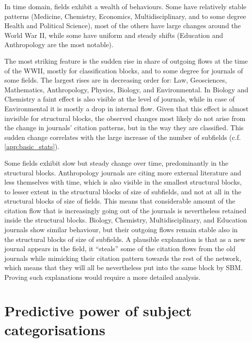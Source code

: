 \documentclass[a4paper,12pt]{article}
\begin{document}
In time domain, fields exhibit a wealth of behaviours. Some have 
relatively stable patterns (Medicine, Chemistry, Economics, Multidisciplinary, and to some 
degree Health and Political Science), most of the others have large changes around the World War II,
while some have uniform and steady shifts (Education and Anthropology are the 
most notable).

The most striking feature is the sudden rise in share of outgoing flows at the 
time of the WWII, mostly for classification blocks, and to some degree for journals 
 of some fields. The largest rises are in decreasing order for: Law, Geosciences, 
Mathematics, Anthropology, Physics, Biology, and Environmental. In Biology and Chemistry a 
faint effect is also visible at the level of journals, while in case of Environmental it is mostly a 
drop in internal flow. Given that this effect is almost invisible for structural blocks,
the observed changes most likely do not arise from the change in journals' citation patterns,
but in the way they are classified.
This sudden change correlates with the large increase of the number of subfields (c.f.
\cref{app:basic_stats}).

Some fields exhibit slow but steady change over time, predominantly
in the structural blocks.
Anthropology journals are 
citing more external literature and less themselves with time, which is also  
visible in the smallest structural blocks, to lesser extent in the structural blocks of size of subfields,
and not at all in the structural blocks of size of fields.
This means that considerable amount of the citation flow that is increasingly going out of the journals is nevertheless retained
inside the structural blocks.
Biology, Chemistry, Multidisciplinary, and 
Education journals show similar behaviour, but their outgoing flows remain 
stable also in the structural blocks of size of subfields.
A plausible explanation is
that as a new journal appears in the field, it ``steals'' some of the citation flows 
from the old journals while mimicking their citation pattern towards the rest of the network,
which means that they will all be nevertheless put into the same block by SBM.
Proving such explanations would require a more detailed analysis.



\section{Predictive power of subject categorisations}
\label{sec:pred_power_of_categories}
\end{document}
